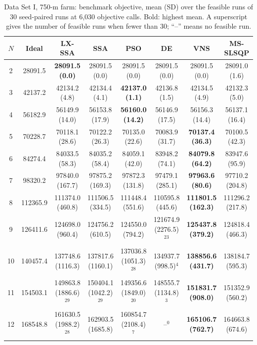 \begin{table}[!t]
\centering
\caption{Data Set I, 750-m farm: benchmark objective, mean (SD) over the feasible runs of 30 seed-paired runs at 6,030 objective calls. Bold: highest mean. A superscript gives the number of feasible runs when fewer than 30; ``--'' means no feasible run.}
\label{tab:res-1-750}
\scriptsize\setlength{\tabcolsep}{3pt}
\begin{tabular}{cccccccc}
\toprule
$N$ & Ideal & LX-SSA & SSA & PSO & DE & VNS & MS-SLSQP \\
\midrule
2 & 28091.5 & \textbf{28091.5 (0.0)} & 28091.5 (0.0) & 28091.5 (0.0) & 28091.5 (0.0) & 28091.5 (0.0) & 28091.0 (1.6) \\
3 & 42137.2 & 42134.2 (4.8) & 42134.4 (4.1) & \textbf{42137.0 (1.1)} & 42136.8 (1.5) & 42134.5 (4.9) & 42132.3 (5.0) \\
4 & 56182.9 & 56149.9 (14.0) & 56153.8 (17.9) & \textbf{56160.0 (14.2)} & 56146.9 (17.5) & 56156.3 (14.4) & 56137.1 (16.4) \\
5 & 70228.7 & 70118.1 (28.6) & 70122.2 (26.3) & 70135.0 (22.6) & 70083.9 (31.7) & \textbf{70137.4 (36.3)} & 70100.5 (42.3) \\
6 & 84274.4 & 84033.5 (58.3) & 84035.2 (58.4) & 84059.1 (42.0) & 83948.2 (74.1) & \textbf{84079.8 (64.2)} & 83947.6 (95.9) \\
7 & 98320.2 & 97840.0 (167.7) & 97875.2 (169.3) & 97872.3 (131.8) & 97479.1 (285.1) & \textbf{97963.6 (80.6)} & 97710.2 (204.8) \\
8 & 112365.9 & 111374.0 (460.8) & 111506.5 (334.5) & 111448.4 (551.6) & 110595.8 (445.6) & \textbf{111801.5 (162.3)} & 111296.2 (217.8) \\
9 & 126411.6 & 124698.0 (960.4) & 124756.2 (610.5) & 124550.0 (794.2) & 121674.9 (2276.5)$^{23}$ & \textbf{125437.8 (379.2)} & 124818.4 (466.3) \\
10 & 140457.4 & 137748.6 (1116.3) & 137817.6 (1160.1) & 137036.8 (1051.3)$^{28}$ & 134937.7 (998.5)$^{4}$ & \textbf{138856.6 (431.7)} & 138184.7 (595.3) \\
11 & 154503.1 & 149863.8 (1886.6)$^{29}$ & 150404.1 (1042.2)$^{29}$ & 149356.6 (1849.0)$^{20}$ & 148555.7 (1134.8)$^{3}$ & \textbf{151831.7 (908.0)} & 151352.9 (560.2) \\
12 & 168548.8 & 161630.5 (1988.2)$^{28}$ & 162903.5 (1685.8) & 160854.7 (2108.4)$^{7}$ & --$^{0}$ & \textbf{165106.7 (762.7)} & 164663.8 (674.6) \\
\bottomrule
\end{tabular}
\end{table}


